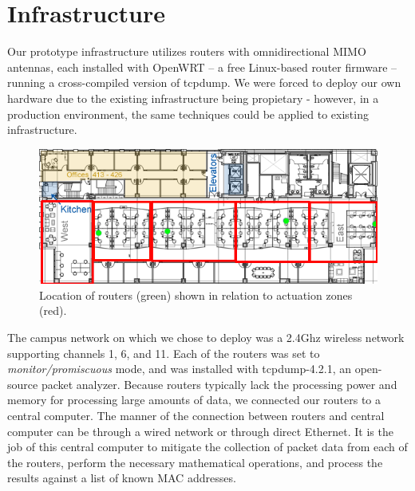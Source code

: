 \section{Infrastructure}
Our prototype infrastructure utilizes routers with omnidirectional MIMO antennas, each installed with OpenWRT -- a free Linux-based router firmware -- running a cross-compiled version of tcpdump. We were forced to deploy our own hardware due to the existing infrastructure being propietary - however, in a production environment, the same techniques could be applied to existing infrastructure.
\begin{figure}[htb]
\begin{center}
\includegraphics[width=\linewidth]{figs/floor4}
\end{center}
\caption{Location of routers (green) shown in relation to actuation zones (red).}
\end{figure}

The campus network on which we chose to deploy was a 2.4Ghz wireless network supporting channels 1, 6, and 11. Each of the routers was set to \emph{monitor/promiscuous} mode, and was installed with tcpdump-4.2.1, an open-source packet analyzer. Because routers typically lack the processing power and memory for processing large amounts of data, we connected our routers to a central computer. The manner of the connection between routers and central computer can be through a wired network or through direct Ethernet. It is the job of this central computer to mitigate the collection of packet data from each of the routers, perform the necessary mathematical operations, and process the results against a list of known MAC addresses. 

